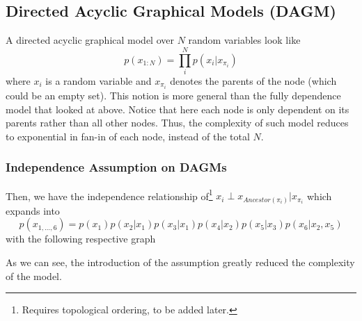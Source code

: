 \documentclass[11pt]{article}
\newcommand{\independent}{\perp}
\begin{document}
\subsection{Directed Acyclic Graphical Models (DAGM)}
A directed acyclic graphical model over $N$ random variables look like
\begin{equation}
    p\left(x_{1:N}\right)=\prod_{i}^{N} p\left(x_{i} | x_{\pi_{i}}\right)
\end{equation}
where $x_i$ is a random variable and $x_{\pi_i}$ denotes the parents of the node (which could be an empty set). This notion is more general than the fully dependence model that looked at above. Notice that here each node is only dependent on its parents rather than all other nodes. Thus, the complexity of such model reduces to exponential in fan-in of each node, instead of the total $N$. 

\subsubsection{Independence Assumption on DAGMs}
Then, we have the independence relationship of\footnote{Requires topological ordering, to be added later. }
$
    x_i \independent x_{Ancestor({\pi_i})} \vert x_{\pi_i}
$
which expands into
\begin{equation}
    p\left(x_{1, \ldots, 6}\right)=p\left(x_{1}\right) p\left(x_{2} | x_{1}\right) p\left(x_{3} | x_{1}\right) p\left(x_{4} | x_{2}\right) p\left(x_{5} | x_{3}\right) p\left(x_{6} | x_{2}, x_{5}\right)
\end{equation}
with the following respective graph
\begin{center}
\end{center}
As we can see, the introduction of the assumption greatly reduced the complexity of the model. 
\end{document}
